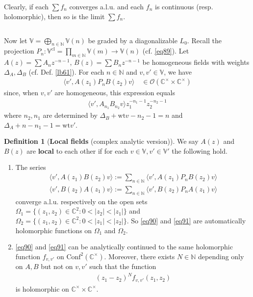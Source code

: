 \documentclass[12pt,a4paper,notitlepage]{article}
\theoremstyle{definition}
\newtheorem{df}{Definition}[section]
\theoremstyle{plain}
\newcommand{\Conf}{\mathrm{Conf}}
\newcommand{\bk}[1]{\langle {#1}\rangle}
\newcommand{\scr}{\mathscr}
\newcommand{\Vbb}{\mathbb V}
\newcommand{\Cbb}{\mathbb C}
\newcommand{\Nbb}{\mathbb N}
\newcommand{\wt}{\mathrm{wt}}
\newcommand{\cl}{\mathrm{cl}}
\numberwithin{equation}{section}
\begin{document}
Clearly, if each $\sum f_n$ converges a.l.u. and each $f_n$ is continuous (resp. holomorphic), then so is the limit $\sum f_n$.



\subsection{}


Now let $\Vbb=\bigoplus_{n\in\Nbb}\Vbb(n)$ be graded by a diagonalizable $L_0$. Recall the projection $P_n:\Vbb^\cl=\prod_{m\in\Nbb}\Vbb(m)\rightarrow \Vbb(n)$ (cf. \eqref{eq89}). Let $A(z)=\sum A_nz^{-n-1}$, $B(z)=\sum B_nz^{-n-1}$ be homogeneous fields with weights $\Delta_A,\Delta_B$ (cf. Def. \ref{lb61}). For each $n\in\Nbb$ and $v,v'\in\Vbb$, we have
\begin{align}
\bk{v',A(z_1)P_nB(z_2)v} \quad \in \scr O(\Cbb^\times\times\Cbb^\times)
\end{align}
since, when $v,v'$ are homogeneous, this expression equals
\begin{align*}
\bk{v',A_{n_1}B_{n_2}v}z_1^{-n_1-1}z_2^{-n_2-1}	
\end{align*}
where $n_2,n_1$ are determined by $\Delta_B+\wt v-n_2-1=n$ and $\Delta_A+n-n_1-1=\wt v'$.
 

\begin{df}[\textbf{Local fields} (complex analytic version)]\label{lb62}
We say $A(z)$ and $B(z)$ are \textbf{local} to each other if for each $v\in\Vbb,v'\in\Vbb'$ the following hold.
\begin{enumerate}
\item The series
\begin{subequations}
\begin{gather}
\bk{v',A(z_1)B(z_2)v}:=\sum_{n\in\Nbb}\bk{v',A(z_1)P_nB(z_2)v}\label{eq90}\\
\bk{v',B(z_2)A(z_1)v}:=\sum_{n\in\Nbb}\bk{v',B(z_2)P_nA(z_1)v}\label{eq91}
\end{gather}
\end{subequations}
converge a.l.u. respectively on the open sets $\Omega_1=\{(z_1,z_2)\in\Cbb^2:0<|z_2|<|z_1|\}$ and $\Omega_2=\{(z_1,z_2)\in\Cbb^2:0<|z_1|<|z_2|\}$. So \eqref{eq90} and \eqref{eq91} are automatically holomorphic functions on $\Omega_1$ and $\Omega_2$.
\item \eqref{eq90} and \eqref{eq91} can be analytically continued to the same holomorphic function $f_{v,v'}$ on $\Conf^2(\Cbb^\times)$. Moreover, there exists $N\in\Nbb$ depending only on $A,B$ but not on $v,v'$ such that the function
\begin{align}
(z_1-z_2)^Nf_{v,v'}(z_1,z_2)	
\end{align}
is holomorphic on $\Cbb^\times\times\Cbb^\times$.
\end{enumerate}
\end{df}
\end{document}
